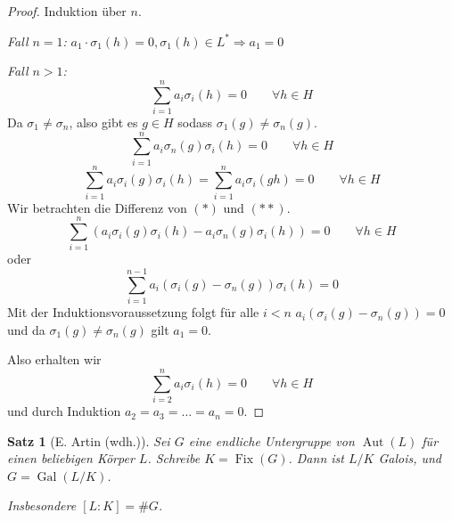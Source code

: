 \documentclass[a4paper,12pt,numbers=noenddot,parskip=full]{scrartcl}
\DeclareMathOperator{\Gal}{Gal}
\theoremstyle{dotless}
\newtheorem{theorem}{Satz}[section]
\theoremstyle{remark}
\begin{document}
	\begin{proof}
		Induktion über $n$.
		
		\textit{Fall $n = 1$:} $a_1 \cdot \sigma_1(h) = 0, \sigma_1(h) \in L^* \Rightarrow a_1 = 0$
		
		\textit{Fall $n > 1$:}
		\begin{equation*}
			\sum_{i = 1}^n a_i \sigma_i(h) = 0 \qquad \forall h \in H
		\end{equation*}
		Da $\sigma_1 \neq \sigma_n$, also gibt es $g \in H$ sodass $\sigma_1(g) \neq \sigma_n(g)$.
		\begin{equation*}
			\sum_{i = 1}^n a_i \sigma_n(g) \sigma_i(h) = 0 \qquad \forall h \in H \tag{$*$}
		\end{equation*}
		\begin{equation*}
			\sum_{i = 1}^n a_i \sigma_i(g) \sigma_i(h) = \sum_{i = 1}^n a_i \sigma_i(gh) = 0 \qquad \forall h \in H \tag{$**$}
		\end{equation*}
		Wir betrachten die Differenz von $(*)$ und $(**)$.
		\begin{equation*}
			\sum_{i = 1}^n (a_i \sigma_i(g) \sigma_i(h) - a_i \sigma_n(g) \sigma_i(h)) = 0 \qquad \forall h \in H
		\end{equation*}
		oder
		\begin{equation*}
			\sum_{i = 1}^{n-1} a_i(\sigma_i(g) - \sigma_n(g)) \sigma_i(h) = 0
		\end{equation*}
		Mit der Induktionsvoraussetzung folgt für alle $i < n$ $a_i(\sigma_i(g) - \sigma_n(g)) = 0$ und da $\sigma_1(g) \neq \sigma_n(g)$ gilt $a_1 = 0$.
		
		Also erhalten wir
		\begin{equation*}
			\sum_{i = 2}^n a_i \sigma_i(h) = 0 \qquad \forall h \in H
		\end{equation*}
		und durch Induktion $a_2 = a_3 = \dots = a_n = 0$.
	\end{proof}

	\begin{theorem}[E. Artin (wdh.)]
		Sei $G$ eine endliche Untergruppe von $\operatorname{Aut}(L)$ für einen beliebigen Körper $L$. Schreibe $K = \operatorname{Fix}(G)$. Dann ist $L/K$ Galois, und $G = \Gal(L/K)$.
		
		Insbesondere $[L:K] = \#G$.
	\end{theorem}
\end{document}
